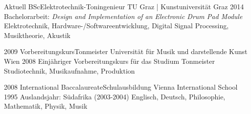 %
%


\begin{experiences}
	\experience
	{Aktuell}
	{BSc}{Elektrotechnik-Toningenieur}
	{TU Graz | Kunstuniversität Graz}
	{2014}
	{
		Bachelorarbeit:
		\textit{Design and Implementation of an Electronic Drum Pad Module}
		\smallskip
	}
	{
		Elektrotechnik,
		Hardware-/Softwareentwicklung,
		Digital Signal Processing,
		Musiktheorie,
		Akustik
	}
	
	\emptySeparator
	
	\experience
	{2009}
	{Vorbereitungskurs}{Tonmeister}
	{Universität für Musik und darstellende Kunst Wien}
	{2008}
	{
		Einjähriger Vorbereitungskurs für das Studium Tonmeister
		\smallskip
	}
	{
		Studiotechnik,
		Musikaufnahme,
		Produktion
	}
	
	\emptySeparator
	
	\experience
	{2008}
	{International Baccalaureate}{Schulausbildung}
	{Vienna International School}
	{1995}
	{
		Auslandsjahr: Südafrika (2003-2004)
		\smallskip
	}
	{
		Englisch,
		Deutsch,
		Philosophie,
		Mathematik,
		Physik,
		Musik
	}
\end{experiences}